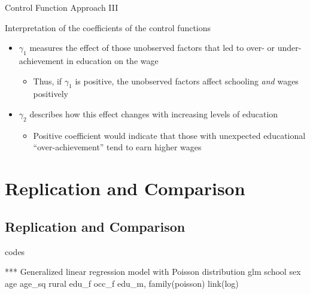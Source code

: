 \documentclass[10pt,ignorenonframetext,]{beamer}
\newenvironment{Shaded}{\begin{snugshade}}{\end{snugshade}}
\newcommand{\ExtensionTok}[1]{#1}
\newcommand{\FunctionTok}[1]{\textcolor[rgb]{0.00,0.00,0.00}{#1}}
\newcommand{\NormalTok}[1]{#1}
\providecommand{\tightlist}{%
  \setlength{\itemsep}{0pt}\setlength{\parskip}{0pt}}
\begin{document}
\begin{frame}{Control Function Approach III}
\protect\hypertarget{control-function-approach-iii}{}

Interpretation of the coefficients of the control functions

\begin{itemize}
\tightlist
\item
  \(\gamma_1\) measures the effect of those unobserved factors that led
  to over- or under-achievement in education on the wage

  \begin{itemize}
  \tightlist
  \item
    Thus, if \(\gamma_1\) is positive, the unobserved factors affect
    schooling \emph{and} wages positively
  \end{itemize}
\item
  \(\gamma_2\) describes how this effect changes with increasing levels
  of education

  \begin{itemize}
  \tightlist
  \item
    Positive coefficient would indicate that those with unexpected
    educational ``over-achievement'' tend to earn higher wages
  \end{itemize}
\end{itemize}

\end{frame}

\hypertarget{replication-and-comparison}{%
\section{Replication and Comparison}\label{replication-and-comparison}}

\hypertarget{replication-and-comparison-1}{%
\subsection{Replication and
Comparison}\label{replication-and-comparison-1}}

\begin{frame}[fragile]{codes}
\protect\hypertarget{codes}{}

\begin{Shaded}
\begin{Highlighting}[]
\ExtensionTok{***}\NormalTok{ Generalized linear regression model with Poisson distribution}
    \ExtensionTok{glm}\NormalTok{ school sex age age_sq rural edu_f occ_f edu_m, family(poisson) }\FunctionTok{link}\NormalTok{(log)}
\end{Highlighting}
\end{Shaded}

\end{frame}
\end{document}

